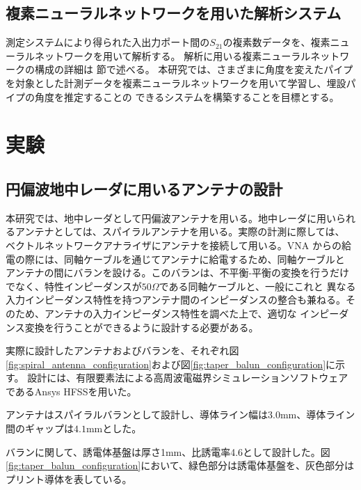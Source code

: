 \documentclass[11pt,a4paper,uplatex]{ujarticle}
\begin{document}
  \newpage

  \subsection{複素ニューラルネットワークを用いた解析システム}

    測定システムにより得られた入出力ポート間の$S_{21}$の複素数データを、複素ニューラルネットワークを用いて解析する。
    解析に用いる複素ニューラルネットワークの構成の詳細は \label{sec:analysis} 節で述べる。
    本研究では、さまざまに角度を変えたパイプを対象とした計測データを複素ニューラルネットワークを用いて学習し、埋設パイプの角度を推定することの
    できるシステムを構築することを目標とする。

\section{実験}

  \subsection{円偏波地中レーダに用いるアンテナの設計}

  本研究では、地中レーダとして円偏波アンテナを用いる。地中レーダに用いられるアンテナとしては、スパイラルアンテナを用いる。実際の計測に際しては、
  ベクトルネットワークアナライザにアンテナを接続して用いる。VNA からの給電の際には、同軸ケーブルを通じてアンテナに給電するため、同軸ケーブルと
  アンテナの間にバランを設ける。このバランは、不平衡-平衡の変換を行うだけでなく、特性インピーダンスが$50\Omega$である同軸ケーブルと、一般にこれと
  異なる入力インピーダンス特性を持つアンテナ間のインピーダンスの整合も兼ねる。そのため、アンテナの入力インピーダンス特性を調べた上で、適切な
  インピーダンス変換を行うことができるように設計する必要がある。

  実際に設計したアンテナおよびバランを、それぞれ図\ref{fig:spiral_antenna_configuration}および図\ref{fig:taper_balun_configuration}に示す。
  設計には、有限要素法による高周波電磁界シミュレーションソフトウェアであるAnsys HFSSを用いた。

  アンテナはスパイラルバランとして設計し、導体ライン幅は$3.0\mathrm{mm}$、導体ライン間のギャップは$4.1\mathrm{mm}$とした。
  
  バランに関して、誘電体基盤は厚さ1mm、比誘電率4.6として設計した。図\ref{fig:taper_balun_configuration}において、緑色部分は誘電体基盤を、灰色部分は
  プリント導体を表している。

\end{document}
